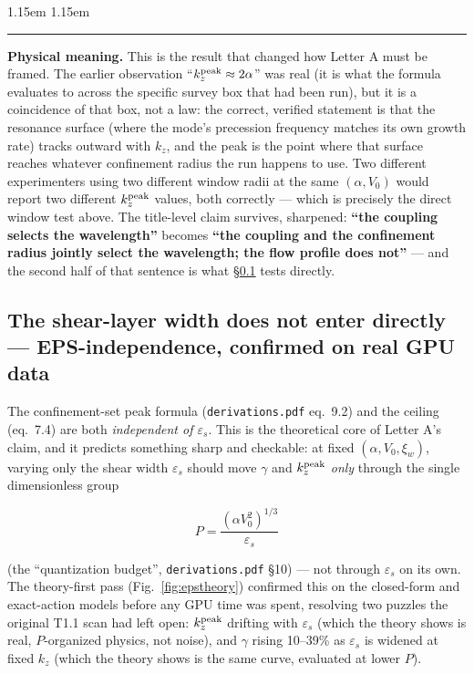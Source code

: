 \documentclass[11pt,a4paper]{article}
\numberwithin{equation}{section}
\theoremstyle{remark}
\newenvironment{physmeaning}%
{\par\medskip\noindent
 \begin{list}{}{\leftmargin 1.15em \rightmargin 1.15em \listparindent 0pt
 \itemindent 0pt \parsep 2pt \topsep 2pt}\item\relax
 \small\textcolor{meancol}{\rule[-0.6ex]{2.6pt}{2.4ex}}\hspace{0.55em}%
 \textcolor{meancol}{\textbf{Physical meaning.}}\hspace{0.5em}\ignorespaces}%
{\end{list}\medskip}
\newcommand{\eps}{\varepsilon_s}
\newcommand{\Vo}{V_0}
\newcommand{\kz}{k_z}
\begin{document}
\begin{physmeaning}
This is the result that changed how Letter A must be framed. The earlier
observation ``$\kz^{\rm peak}\approx2\alpha$'' was real (it is what the
formula evaluates to across the specific survey box that had been run),
but it is a coincidence of that box, not a law: the correct, verified
statement is that the resonance surface (where the mode's precession
frequency matches its own growth rate) tracks outward with $\kz$, and the
peak is the point where that surface reaches whatever confinement radius
the run happens to use. Two different experimenters using two different
window radii at the same $(\alpha,\Vo)$ would report two different
$\kz^{\rm peak}$ values, both correctly — which is precisely the direct
window test above. The title-level claim survives, sharpened:
\textbf{``the coupling selects the wavelength''} becomes \textbf{``the
coupling and the confinement radius jointly select the wavelength; the
flow profile does not''} --- and the second half of that sentence is what
\S\ref{ssec:epsresult} tests directly.
\end{physmeaning}

\subsection{The shear-layer width does not enter directly ---
EPS-independence, confirmed on real GPU data}
\label{ssec:epsresult}

The confinement-set peak formula (\texttt{derivations.pdf} eq.~9.2) and
the ceiling (eq.~7.4) are both \emph{independent of $\eps$}. This is the
theoretical core of Letter A's claim, and it predicts something sharp
and checkable: at fixed $(\alpha,\Vo,\xi_w)$, varying only the shear width
$\eps$ should move $\gamma$ and $\kz^{\rm peak}$ \emph{only} through the
single dimensionless group

\begin{equation}
P=\frac{(\alpha\Vo^2)^{1/3}}{\eps}
\end{equation}

(the ``quantization budget'', \texttt{derivations.pdf} \S10) --- not
through $\eps$ on its own. The theory-first pass (Fig.~\ref{fig:epstheory})
confirmed this on the closed-form and exact-action models before any GPU
time was spent, resolving two puzzles the original T1.1 scan had left
open: $\kz^{\rm peak}$ drifting with $\eps$ (which the theory shows is
real, $P$-organized physics, not noise), and $\gamma$ rising 10--39\% as
$\eps$ is widened at fixed $\kz$ (which the theory shows is the same
curve, evaluated at lower $P$).
\end{document}
